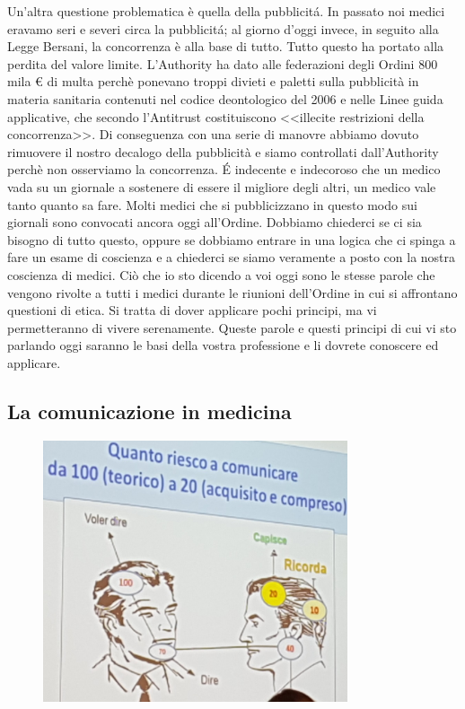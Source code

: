 Un'altra questione problematica è quella della pubblicitá. In passato
noi medici eravamo seri e severi circa la pubblicitá; al giorno d'oggi
invece, in seguito alla Legge Bersani, la concorrenza è alla base di
tutto. Tutto questo ha portato alla perdita del valore limite.
L'Authority ha dato alle federazioni degli Ordini 800 mila \euro{} di
multa perchè ponevano troppi divieti e paletti sulla pubblicità in
materia sanitaria contenuti nel codice deontologico del 2006 e nelle
Linee guida applicative, che secondo l'Antitrust costituiscono
\textless{}\textless{}illecite restrizioni della
concorrenza\textgreater{}\textgreater{}. Di conseguenza con una serie di
manovre abbiamo dovuto rimuovere il nostro decalogo della pubblicità e
siamo controllati dall'Authority perchè non osserviamo la concorrenza. É
indecente e indecoroso che un medico vada su un giornale a sostenere di
essere il migliore degli altri, un medico vale tanto quanto sa fare.
Molti medici che si pubblicizzano in questo modo sui giornali sono
convocati ancora oggi all'Ordine. Dobbiamo chiederci se ci sia bisogno
di tutto questo, oppure se dobbiamo entrare in una logica che ci spinga
a fare un esame di coscienza e a chiederci se siamo veramente a posto
con la nostra coscienza di medici. Ciò che io sto dicendo a voi oggi
sono le stesse parole che vengono rivolte a tutti i medici durante le
riunioni dell'Ordine in cui si affrontano questioni di etica. Si tratta
di dover applicare pochi principi, ma vi permetteranno di vivere
serenamente. Queste parole e questi principi di cui vi sto parlando oggi
saranno le basi della vostra professione e li dovrete conoscere ed
applicare.

\subsection{La comunicazione in medicina}

\begin{figure}[!ht]
\centering
	\includegraphics[width=0.8\textwidth]{29/image7.jpeg}
	\end{figure}

